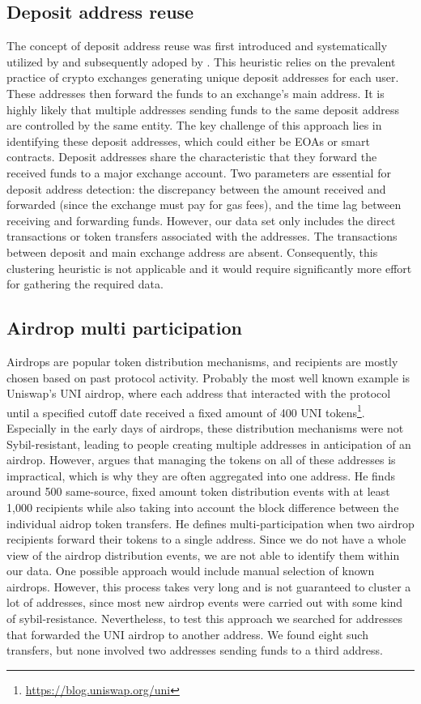 \documentclass[12pt,a4paper,titlepage,oneside,english]{article}
\begin{document}
\subsection{Deposit address reuse}
The concept of deposit address reuse was first introduced and systematically utilized by \cite{FV:17} and subsequently adoped by \cite{wu2022tutela}. This heuristic relies on the prevalent practice of crypto exchanges generating unique deposit addresses for each user. These addresses then forward the funds to an exchange's main address. It is highly likely that multiple addresses sending funds to the same deposit address are controlled by the same entity. The key challenge of this approach lies in identifying these deposit addresses, which could either be EOAs or smart contracts. \citep{FV:17}\newline
Deposit addresses share the characteristic that they forward the received funds to a major exchange account. Two parameters are essential for deposit address detection: the discrepancy between the amount received and forwarded (since the exchange must pay for gas fees), and the time lag between receiving and forwarding funds.
However, our data set only includes the direct transactions or token transfers associated with the addresses. The transactions between deposit and main exchange address are absent. Consequently, this clustering heuristic is not applicable %
 and it would require significantly more effort for gathering the required data.

\subsection{Airdrop multi participation}
Airdrops are popular token distribution mechanisms, and recipients are mostly chosen based on past protocol activity. Probably the most well known example is Uniswap's UNI airdrop, where each address that interacted with the protocol until a specified cutoff date received a fixed amount of 400 UNI tokens\footnote{\url{https://blog.uniswap.org/uni}}. Especially in the early days of airdrops, these distribution mechanisms were not Sybil-resistant, leading to people creating multiple addresses in anticipation of an airdrop. However, \cite{FV:17} argues that managing the tokens on all of these addresses is impractical, which is why they are often aggregated into one address. He finds around 500 same-source, fixed amount token distribution events with at least 1,000 recipients while also taking into account the block difference between the individual aidrop token transfers. He defines multi-participation when two airdrop recipients forward their tokens to a single address. Since we do not have a whole view of the airdrop distribution events, we are not able to identify them within our data. One possible approach would include manual selection of known airdrops. However, this process takes very long and is not guaranteed to cluster a lot of addresses, since most new airdrop events were carried out with some kind of sybil-resistance. Nevertheless, to test this approach we searched for addresses that forwarded the UNI airdrop to another address. We found eight such transfers, but none involved two addresses sending funds to a third address.
\end{document}
